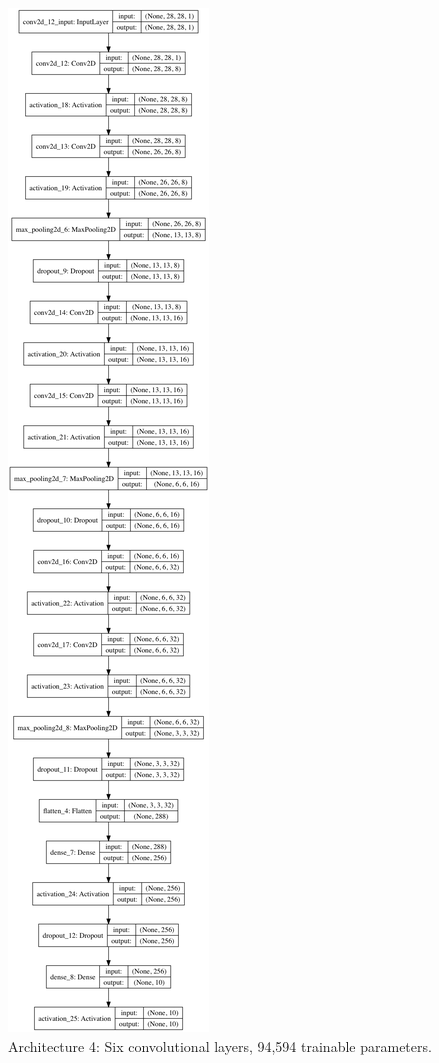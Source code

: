 \documentclass[letterpaper, 10 pt, conference]{ieeeconf}  %
\begin{document}
\begin{figure}
      \centering
      \includegraphics[scale =.2]{model3.png}
		\centering
      \caption{Architecture 4: Six convolutional layers, 94,594 trainable parameters.}
      \label{figurelabel}
 \end{figure}
\end{document}

